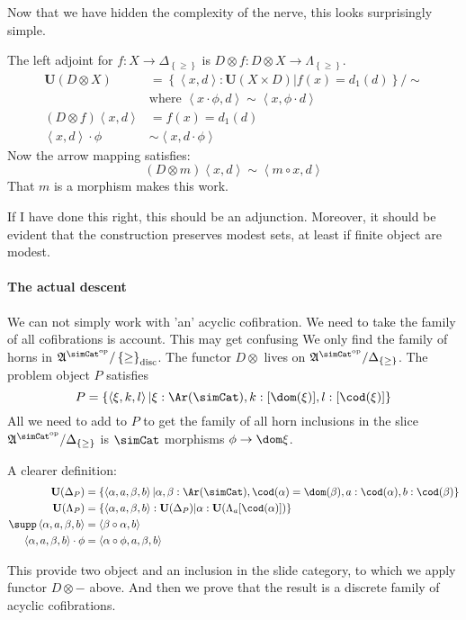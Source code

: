 \documentclass{tac}
\newcommand\set[1]{\left\{#1\right\}}
\newcommand\dual{^{\mathrm{op}}}
\newcommand\s{^{\simCat\dual}}
\newcommand\of{:}
\newcommand\simplex\Delta
\newcommand\horn\Lambda
\newcommand\tuplet[1]{\left\langle #1 \right\rangle}
\newcommand\base{\mathbf{U}}
\newcommand\ambient{\mathfrak A}
\newcommand\disc{_{\rm disc}}
\begin{document}
Now that we have hidden the complexity of the nerve, this looks surprisingly simple.

The left adjoint for $f\of X\to \simplex_{\set\geq}$ is $D\otimes f \of D\otimes X \to \horn_{\set\geq}$.
\begin{align*}
\base(D\otimes X) &= \set{\tuplet{x,d}\of \base(X\times D)|f(x)=d_1(d)}/\sim\\
& \textrm{where }\tuplet{x\cdot\phi,d}\sim\tuplet{x,\phi\cdot d}\\
(D\otimes f)\tuplet{x,d} &= f(x)=d_1(d)\\
\tuplet{x,d}\cdot\phi &\sim \tuplet{x,d\cdot \phi}
\end{align*}
Now the arrow mapping satisfies:
\[ (D\otimes m)\tuplet{x,d} \sim \tuplet{m\circ x,d} \]
That $m$ is a morphism makes this work.


If I have done this right, this should be an adjunction. Moreover, it should be evident that the construction preserves modest sets, at least if finite object are modest.

\paragraph{The actual descent}
We can not simply work with 'an' acyclic cofibration. We need to take the family of all cofibrations is account. This may get confusing
We only find the family of horns in $\ambient\s/\set\geq\disc$. The functor $D\otimes$ lives on $\ambient\s/\simplex_{\set\geq}$. 
The problem object $P$ satisfies \[P = \set{\tuplet{\xi,k,l}|\xi\of\Ar(\simCat),k\of[\dom(\xi)],l\of[\cod(\xi)] }\] 
All we need to add to $P$ to get the family of all horn inclusions in the slice $\ambient\s/\simplex_{\set\geq}$ is $\simCat$ morphisms $\phi\to \dom\xi$.

A clearer definition:
\begin{align*}
\base(\simplex_P) &= \set{\tuplet{\alpha,a,\beta,b}| 
\alpha,\beta\of\Ar(\simCat),\cod(\alpha)=\dom(\beta),
a\of\cod(\alpha),b\of\cod(\beta)}\\
\base(\horn_P) &= \set{\tuplet{\alpha,a,\beta,b}\of \base(\simplex_P)|\alpha\of\base(\horn_a[\cod(\alpha)])}\\
\supp\tuplet{\alpha,a,\beta,b} &= \tuplet{\beta\circ \alpha,b}\\
\tuplet{\alpha,a,\beta,b}\cdot\phi &= \tuplet{\alpha\circ \phi,a,\beta,b}
\end{align*}

This provide two object and an inclusion in the slide category, to which we apply functor $D\otimes-$ above. And then we prove that the result is a discrete family of acyclic cofibrations.
\end{document}
